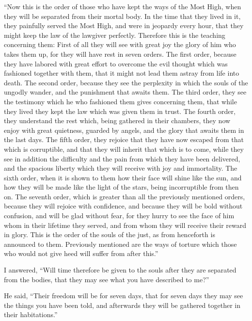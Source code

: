  ``Now this is the order of those who have kept the ways
of the Most High, when they will be separated from their mortal body.
 In the time that they lived in it, they painfully served
the Most High, and were in jeopardy every hour, that they might keep the
law of the lawgiver perfectly.  Therefore this is the
teaching concerning them:  First of all they will see
with great joy the glory of him who takes them up, for they will have
rest in seven orders.  The first order, because they have
labored with great effort to overcome the evil thought which was
fashioned together with them, that it might not lead them astray from
life into death.  The second order, because they see the
perplexity in which the souls of the ungodly wander, and the punishment
that awaits them.  The third order, they see the
testimony which he who fashioned them gives concerning them, that while
they lived they kept the law which was given them in trust.
 The fourth order, they understand the rest which, being
gathered in their chambers, they now enjoy with great quietness, guarded
by angels, and the glory that awaits them in the last days.
 The fifth order, they rejoice that they have now escaped
from that which is corruptible, and that they will inherit that which is
to come, while they see in addition the difficulty and the pain from
which they have been delivered, and the spacious liberty which they will
receive with joy and immortality.  The sixth order, when
it is shown to them how their face will shine like the sun, and how they
will be made like the light of the stars, being incorruptible from then
on.  The seventh order, which is greater than all the
previously mentioned orders, because they will rejoice with confidence,
and because they will be bold without confusion, and will be glad
without fear, for they hurry to see the face of him whom in their
lifetime they served, and from whom they will receive their reward in
glory.  This is the order of the souls of the just, as
from henceforth is announced to them. Previously mentioned are the ways
of torture which those who would not give heed will suffer from after
this.''

 I answered, ``Will time therefore be given to the souls
after they are separated from the bodies, that they may see what you
have described to me?''

 He said, ``Their freedom will be for seven days, that
for seven days they may see the things you have been told, and
afterwards they will be gathered together in their habitations.''


